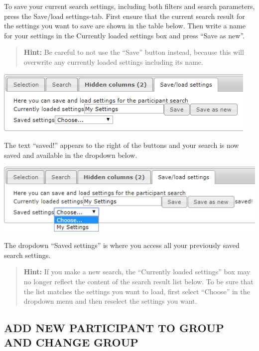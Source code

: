\documentclass[]{book}
\begin{document}
To save your current search settings, including both filters and search parameters, press the Save/load settings-tab. First ensure that the current search result for the settings you want to save are shown in the table below. Then write a name for your settings in the Currently loaded settings box and press ``Save as new''.

\begin{quote}
\textbf{Hint:} Be careful to not use the ``Save'' button instead, because this will overwrite any currently loaded settings including its name.
\end{quote}

\includegraphics{images/save-load1.png}

The text ``saved!'' appears to the right of the buttons and your search is now saved and available in the dropdown below.

\includegraphics{images/save-load2.png}

The dropdown ``Saved settings'' is where you access all your previously saved search settings.

\begin{quote}
\textbf{Hint:} If you make a new search, the ``Currently loaded settings'' box may no longer reflect the content of the search result list below. To be sure that the list matches the settings you want to load, first select ``Choose'' in the dropdown menu and then reselect the settings you want.
\end{quote}

\hypertarget{add-new-participant-to-group-and-change-group}{%
\subsection{ADD NEW PARTICIPANT TO GROUP AND CHANGE GROUP}\label{add-new-participant-to-group-and-change-group}}
\end{document}
